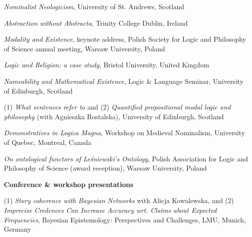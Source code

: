 \documentclass[10pt, a4paper]{article}
\newcommand{\years}[1]{\marginnote{\normalsize #1}}
\begin{document}
 \emph{Nominalist   Neologicism},  University of St. Andrews, Scotland


\vspace{0.5mm}

\emph{Abstraction without Abstracta},    Trinity College Dublin, Ireland


\vspace{0.5mm}


 \emph{Modality and Existence}, keynote address, Polish Society for Logic and Philosophy of Science annual \newline meeting,  Warsaw University, Poland


\vspace{0.5mm}



 \emph{Logic and Religion: a case study},    Bristol University, United Kingdom



\vspace{0.5mm}


\emph{Nameability and Mathematical Existence},  Logic \& Language Seminar,   University of Edinburgh, Scotland


\vspace{0.5mm}

\years{2008}
  (1) \emph{What   sentences   refer   to} and (2)
\emph{Quantified propositional modal  logic and philosophy} (with Agnieszka Rostalska),       University   of    Edinburgh,
Scotland


\vspace{0.5mm}


\years{2006} \emph{Demonstratives in Logica Magna}, Workshop on Medieval Nominalism,  University of Quebec, Montreal, Canada


\vspace{0.5mm}



 \years{2005}\emph{On ontological functors of Le{\'s}niewski's Ontology},  Polish Association for Logic and Philosophy of
Science (award reception),  Warsaw University, Poland

\vspace{1.5mm}



 {\sc \textbf{Conference \& workshop presentations}}\normalsize



\noindent

\vspace{1.5mm}


\years{2020}  (1) \emph{Story coherence with Bayesian Networks} with Alicja Kowalewska, and (2) \emph{ Imprecise Credences Can Increase Accuracy wrt. Claims about Expected Frequencies}, Bayesian Epistemology: Perspectives and Challenges, LMU, Munich, Germany
\end{document}
